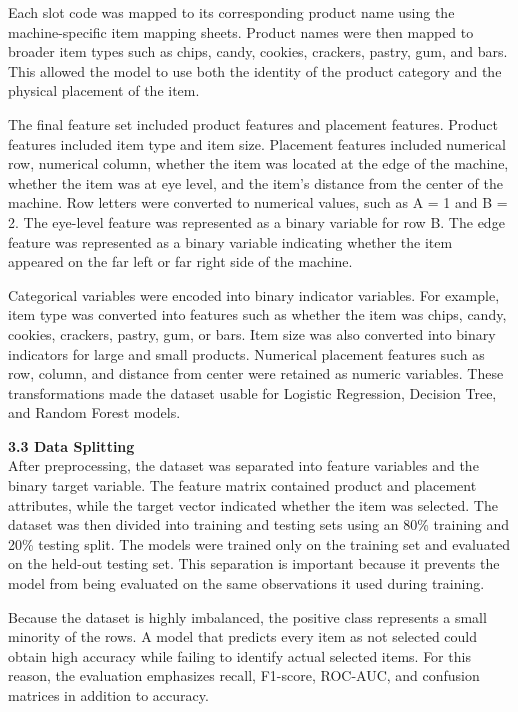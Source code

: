 \documentclass{article}
\begin{document}
Each slot code was mapped to its corresponding product name using the machine-specific item mapping sheets. Product names were then mapped to broader item types such as chips, candy, cookies, crackers, pastry, gum, and bars. This allowed the model to use both the identity of the product category and the physical placement of the item.

The final feature set included product features and placement features. Product features included item type and item size. Placement features included numerical row, numerical column, whether the item was located at the edge of the machine, whether the item was at eye level, and the item's distance from the center of the machine. Row letters were converted to numerical values, such as A = 1 and B = 2. The eye-level feature was represented as a binary variable for row B. The edge feature was represented as a binary variable indicating whether the item appeared on the far left or far right side of the machine.

Categorical variables were encoded into binary indicator variables. For example, item type was converted into features such as whether the item was chips, candy, cookies, crackers, pastry, gum, or bars. Item size was also converted into binary indicators for large and small products. Numerical placement features such as row, column, and distance from center were retained as numeric variables. These transformations made the dataset usable for Logistic Regression, Decision Tree, and Random Forest models.

\textbf{3.3 Data Splitting} \\

After preprocessing, the dataset was separated into feature variables and the binary target variable. The feature matrix contained product and placement attributes, while the target vector indicated whether the item was selected. The dataset was then divided into training and testing sets using an 80\% training and 20\% testing split. The models were trained only on the training set and evaluated on the held-out testing set. This separation is important because it prevents the model from being evaluated on the same observations it used during training.

Because the dataset is highly imbalanced, the positive class represents a small minority of the rows. A model that predicts every item as not selected could obtain high accuracy while failing to identify actual selected items. For this reason, the evaluation emphasizes recall, F1-score, ROC-AUC, and confusion matrices in addition to accuracy.
\end{document}
